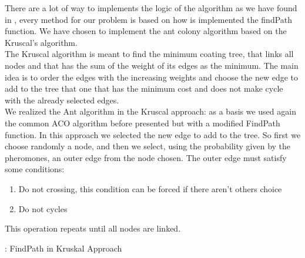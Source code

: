 There are a lot of way to implements the logic of the algorithm as we have found in \cite{nedlin2017ant}, every method for our problem is based on how is implemented the findPath function. We have chosen to implement the ant colony algorithm based on the Kruscal’s algorithm. \\
The Kruscal algorithm \cite{kruskal1956shortest} is meant to find the minimum coating tree, that links all nodes and that has the sum of the weight of its edges as the minimum. The main idea is to order the edges with the increasing weights and choose the new edge to add to the tree that one that has the minimum cost and does not make cycle with the already selected edges.\\
We realized the Ant algorithm in the Kruscal approach: as a basis we used again the common ACO algorithm before presented but with a modified FindPath function. In this approach we selected the new edge to add to the tree. So first we choose randomly a node, and then we select, using the probability given by the pheromones, an outer edge from the node chosen. The outer edge must satisfy some conditions:
\begin{enumerate}
\setlength{\parskip}{0pt}
\setlength{\itemsep}{0pt plus 1pt}
\item Do not crossing, this condition can be forced if there aren’t others choice
\item Do not cycles
\end{enumerate}
This operation repeats until all nodes are linked.

\begin{algorithm}[H]
\caption{: FindPath in Kruskal Approach} \label{alg:SC}
\begin{algorithmic} 
\REPEAT
{}
\end{algorithmic}
\end{algorithm}

